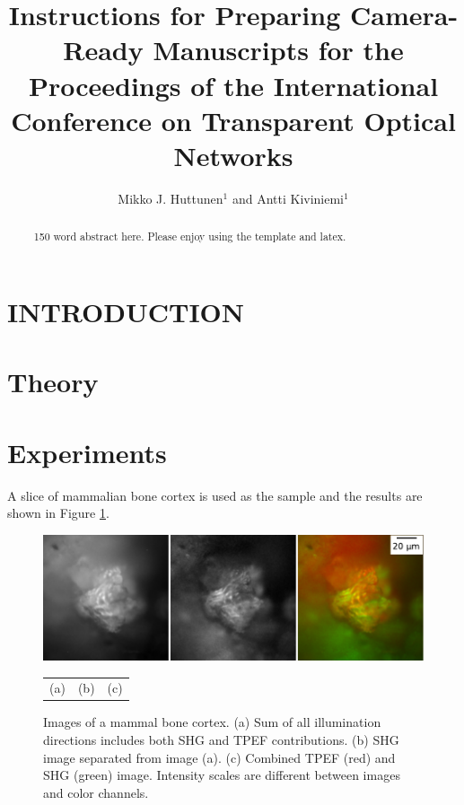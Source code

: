 \documentclass[letterpaper,10pt]{article}
\begin{document}
\title{Instructions for Preparing Camera-Ready Manuscripts for
the Proceedings of the International Conference on Transparent Optical Networks}


\author{Mikko J. Huttunen$^{1}$ and Antti Kiviniemi$^{1}$}

\address{{\affN}Photonics Laboratory, Physics Unit, Tampere University, Tampere, Finland}


\justify
\begin{abstract} ~150 word abstract here. Please enjoy using the template and latex.
\end{abstract}
%

\section{INTRODUCTION}

\section{Theory}
%
\section{Experiments}
A slice of mammalian bone cortex is used as the sample and the results are shown in Figure \ref{fig:bone}.

\begin{figure}[h!!]
	\begin{center}
		\includegraphics[width=\linewidth]{24508.pdf}
	\end{center}
	\vspace{-14mm}
	\begin{tabularx}{\textwidth}{XXX}
		\color{white}(a) & \color{white}(b) & \color{white}(c)
	\end{tabularx}
	\caption{Images of a mammal bone cortex. (a) Sum of all illumination directions includes both SHG and TPEF contributions. (b) SHG image separated from image (a). (c) Combined TPEF (red) and SHG (green) image. Intensity scales are different between images and color channels.}
	\label{fig:bone}
\end{figure}
\end{document}
